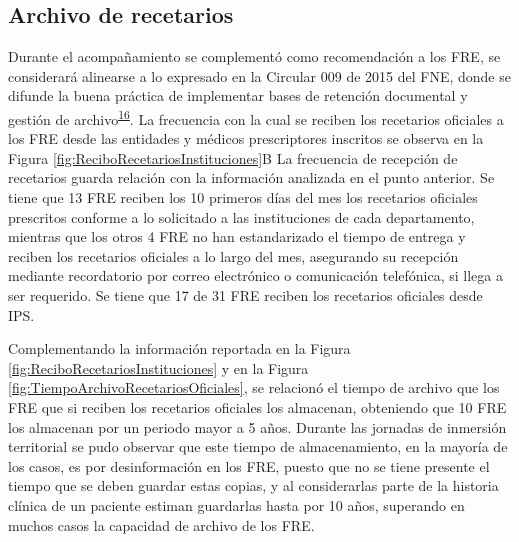 \documentclass[
  oneside]{book}
\begin{document}
\hypertarget{archivo-de-recetarios}{%
\subsection{Archivo de recetarios}\label{archivo-de-recetarios}}

Durante el acompañamiento se complementó como recomendación a los FRE, se considerará alinearse a lo expresado en la Circular 009 de 2015 del FNE, donde se difunde la buena práctica de implementar bases de retención documental y gestión de archivo\textsuperscript{\protect\hyperlink{ref-FNE2015-9}{16}}. La frecuencia con la cual se reciben los recetarios oficiales a los FRE desde las entidades y médicos prescriptores inscritos se observa en la Figura \ref{fig:ReciboRecetariosInstituciones}B La frecuencia de recepción de recetarios guarda relación con la información analizada en el punto anterior. Se tiene que 13 FRE reciben los 10 primeros días del mes los recetarios oficiales prescritos conforme a lo solicitado a las instituciones de cada departamento, mientras que los otros 4 FRE no han estandarizado el tiempo de entrega y reciben los recetarios oficiales a lo largo del mes, asegurando su recepción mediante recordatorio por correo electrónico o comunicación telefónica, si llega a ser requerido. Se tiene que 17 de 31 FRE reciben los recetarios oficiales desde IPS.

Complementando la información reportada en la Figura \ref{fig:ReciboRecetariosInstituciones} y en la Figura \ref{fig:TiempoArchivoRecetariosOficiales}, se relacionó el tiempo de archivo que los FRE que si reciben los recetarios oficiales los almacenan, obteniendo que 10 FRE los almacenan por un periodo mayor a 5 años. Durante las jornadas de inmersión territorial se pudo observar que este tiempo de almacenamiento, en la mayoría de los casos, es por desinformación en los FRE, puesto que no se tiene presente el tiempo que se deben guardar estas copias, y al considerarlas parte de la historia clínica de un paciente estiman guardarlas hasta por 10 años, superando en muchos casos la capacidad de archivo de los FRE.
\end{document}
